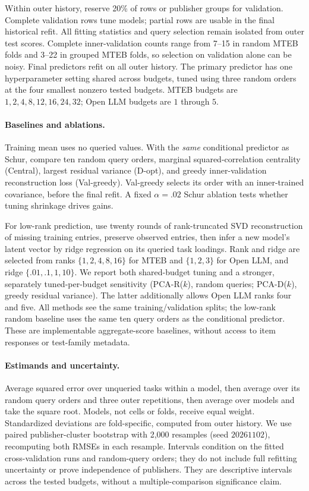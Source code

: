 \documentclass{article}
\begin{document}
Within outer history, reserve 20\% of rows or publisher groups for validation. Complete validation rows tune models; partial rows are usable in the final historical refit. All fitting statistics and query selection remain isolated from outer test scores. Complete inner-validation counts range from 7--15 in random MTEB folds and 3--22 in grouped MTEB folds, so selection on validation alone can be noisy. Final predictors refit on all outer history. The primary predictor has one hyperparameter setting shared across budgets, tuned using three random orders at the four smallest nonzero tested budgets. MTEB budgets are $1,2,4,8,12,16,24,32$; Open LLM budgets are $1$ through $5$.

\paragraph{Baselines and ablations.}
Training mean uses no queried values. With the \emph{same} conditional predictor as Schur, compare ten random query orders, marginal squared-correlation centrality (Central), largest residual variance (D-opt), and greedy inner-validation reconstruction loss (Val-greedy). Val-greedy selects its order with an inner-trained covariance, before the final refit. A fixed $\alpha=.02$ Schur ablation tests whether tuning shrinkage drives gains.

For low-rank prediction, use twenty rounds of rank-truncated SVD reconstruction of missing training entries, preserve observed entries, then infer a new model's latent vector by ridge regression on its queried task loadings. Rank and ridge are selected from ranks $\{1,2,4,8,16\}$ for MTEB and $\{1,2,3\}$ for Open LLM, and ridge $\{.01,.1,1,10\}$. We report both shared-budget tuning and a stronger, separately tuned-per-budget sensitivity (PCA-R($k$), random queries; PCA-D($k$), greedy residual variance). The latter additionally allows Open LLM ranks four and five. All methods see the same training/validation splits; the low-rank random baseline uses the same ten query orders as the conditional predictor. These are implementable aggregate-score baselines, without access to item responses or test-family metadata.

\paragraph{Estimands and uncertainty.}
Average squared error over unqueried tasks within a model, then average over its random query orders and three outer repetitions, then average over models and take the square root. Models, not cells or folds, receive equal weight. Standardized deviations are fold-specific, computed from outer history. We use paired publisher-cluster bootstrap with 2,000 resamples (seed $20261102$), recomputing both RMSEs in each resample. Intervals condition on the fitted cross-validation runs and random-query orders; they do not include full refitting uncertainty or prove independence of publishers. They are descriptive intervals across the tested budgets, without a multiple-comparison significance claim.
\end{document}
